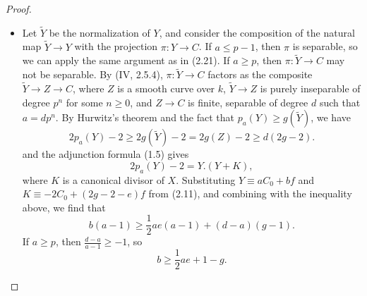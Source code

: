 \documentclass[a4paper]{article}
\begin{document}
\begin{enumerate} [label=\textbf{\arabic*.}, leftmargin=0em]
          \begin{proof} $ $ \vspace{0pt}
              \begin{itemize} [leftmargin=0cm]
                  \item[(a)] Let $\tilde{Y}$ be the normalization of $Y$, and consider the composition of the natural map $\tilde{Y} \to Y$ with the projection $\pi : Y \to C$.
                        If $a \leq p - 1$, then $\pi$ is separable, so we can apply the same argument as in (2.21).
                        If $a \geq p$, then $\pi : \tilde{Y} \to C$ may not be separable.
                        By (IV, 2.5.4), $\pi : \tilde{Y} \to C$ factors as the composite $\tilde{Y} \to Z \to C$, where $Z$ is a smooth curve over $k$, $\tilde{Y} \to Z$ is purely inseparable of degree $p^n$ for some $n \geq 0$, and $Z \to C$ is finite, separable of degree $d$ such that $a = d p^n$.
                        By Hurwitz's theorem and the fact that $p_a(Y) \geq g(\tilde{Y})$, we have
                        \begin{equation*}
                            2p_a(Y) - 2 \geq 2g(\tilde{Y}) - 2 = 2g(Z) - 2 \geq d(2g - 2).
                        \end{equation*}
                        and the adjunction formula (1.5) gives
                        \begin{equation*}
                            2p_a(Y) - 2 = Y.(Y + K),
                        \end{equation*}
                        where $K$ is a canonical divisor of $X$.
                        Substituting $Y \equiv aC_0 + bf$ and $K \equiv -2C_0 + (2g - 2 - e)f$ from (2.11), and combining with the inequality above, we find that
                        \begin{equation*}
                            b(a - 1) \geq \frac{1}{2}ae(a - 1) + (d - a)(g - 1).
                        \end{equation*}
                        If $a \geq p$, then $\frac{d - a}{a - 1} \geq -1$, so
                        \begin{equation*}
                            b \geq \frac{1}{2}ae + 1 - g.
                        \end{equation*}


\end{itemize}
\end{proof}
\end{enumerate}
\end{document}

